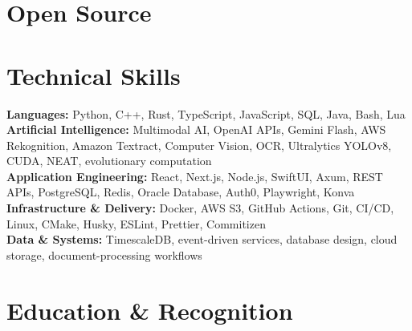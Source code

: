 \documentclass{../../../../Styles/MG-Style}
\begin{document}
\section{Open Source}

\begin{itemize}
\end{itemize}

\section{Technical Skills}
\small
\textbf{Languages:} Python, C++, Rust, TypeScript, JavaScript, SQL, Java, Bash, Lua \\
\textbf{Artificial Intelligence:} Multimodal AI, OpenAI APIs, Gemini Flash, AWS Rekognition, Amazon Textract, Computer Vision, OCR, Ultralytics YOLOv8, CUDA, NEAT, evolutionary computation \\
\textbf{Application Engineering:} React, Next.js, Node.js, SwiftUI, Axum, REST APIs, PostgreSQL, Redis, Oracle Database, Auth0, Playwright, Konva \\
\textbf{Infrastructure \& Delivery:} Docker, AWS S3, GitHub Actions, Git, CI/CD, Linux, CMake, Husky, ESLint, Prettier, Commitizen \\
\textbf{Data \& Systems:} TimescaleDB, event-driven services, database design, cloud storage, document-processing workflows

\section{Education \& Recognition}

\begin{itemize}
\end{itemize}
\end{document}

